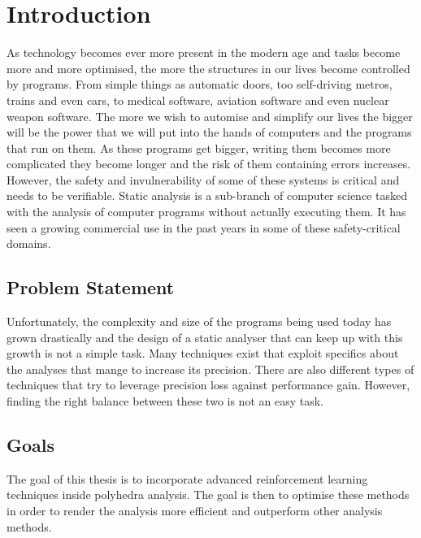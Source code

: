 
\setcounter{chapter}{0}

\chapter{Introduction}
As technology becomes ever more present in the modern age and tasks become more and more optimised, the more the structures in our lives become controlled by programs. From simple things as automatic doors, too self-driving metros, trains and even cars, to medical software, aviation software and even nuclear weapon software. The more we wish to automise and simplify our lives the bigger will be the power that we will put into the hands of computers and the programs that run on them. As these programs get bigger, writing them becomes more complicated they become longer and the risk of them containing errors increases. However, the safety and invulnerability of some of these systems is critical and needs to be verifiable. Static analysis is a sub-branch of computer science tasked with the analysis of computer programs without actually executing them. It has seen a growing commercial use in the past years in some of these safety-critical domains. 

\section{Problem Statement}

Unfortunately, the complexity and size of the programs being used today has grown drastically and the design of a static analyser that can keep up with this growth is not a simple task. Many techniques exist that exploit specifics about the analyses that mange to increase its precision. There are also different types of techniques that try to leverage precision loss against performance gain. However, finding the right balance between these two is not an easy task.
 

\section{Goals}

The goal of this thesis is to incorporate advanced reinforcement learning techniques inside polyhedra analysis. The goal is then to optimise these methods in order to render the analysis more efficient and outperform other analysis methods.


